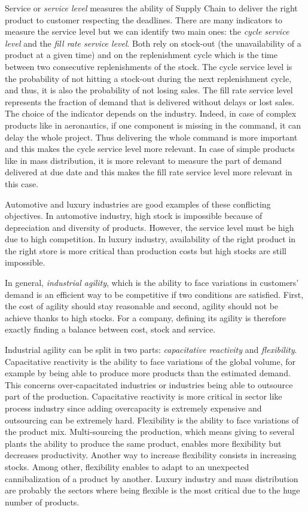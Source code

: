 Service or \emph{service level} measures the ability of Supply Chain to deliver the right product to customer respecting the deadlines.
There are many indicators to measure the service level but we can identify two main ones: the \emph{cycle service level} and the \emph{fill rate service level}.
Both rely on stock-out (\ie the unavailability of a product at a given time) and on the replenishment cycle which is the time between two consecutive replenishments of the stock.
The cycle service level is the probability of not hitting a stock-out during the next replenishment cycle, and thus, it is also the probability of not losing sales.
The fill rate service level represents the fraction of demand that is delivered without delays or lost sales.
The choice of the indicator depends on the industry.
Indeed, in case of complex products like in aeronautics, if one component is missing in the command, it can delay the whole project.
Thus delivering the whole command is more important and this makes the cycle service level more relevant.
In case of simple products like in mass distribution, it is more relevant to measure the part of demand delivered at due date and this makes the fill rate service level more relevant in this case.


\medskip


Automotive and luxury industries are good examples of these conflicting objectives.
In automotive industry, high stock is impossible because of depreciation and diversity of products.
However, the service level must be high due to high competition.
In luxury industry, availability of the right product in the right store is more critical than production costs but high stocks are still impossible.


In general, \emph{industrial agility}, which is the ability to face variations in customers' demand is an efficient way to be competitive if two conditions are satisfied.
First, the cost of agility should stay reasonable and second, agility should not be achieve thanks to high stocks.
For a company, defining its agility is therefore exactly finding a balance between cost, stock and service.


Industrial agility can be split in two parts: \emph{capacitative reactivity} and \emph{flexibility}.
Capacitative reactivity is the ability to face variations of the global volume, for example by being able to produce more products than the estimated demand.
This concerns over-capacitated industries or industries being able to outsource part of the production.
Capacitative reactivity is more critical in sector like process industry since adding overcapacity is extremely expensive and outsourcing can be extremely hard.
Flexibility is the ability to face variations of the product mix.
Multi-sourcing the production, which means giving to several plants the ability to produce the same product, enables more flexibility but decreases productivity.
Another way to increase flexibility consists in increasing stocks.
Among other, flexibility enables to adapt to an unexpected cannibalization of a product by another.
Luxury industry and mass distribution are probably the sectors where being flexible is the most critical due to the huge number of products.


